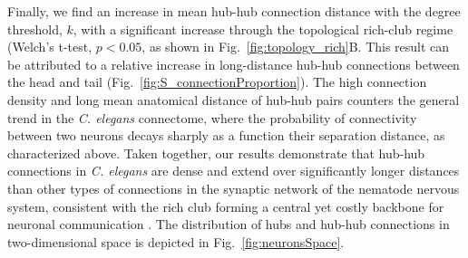 \documentclass[10pt,letterpaper]{article}
\begin{document}
Finally, we find an increase in mean hub-hub connection distance with the degree threshold, $k$, with a significant increase through the topological rich-club regime (Welch's t-test, $p < 0.05$, as shown in Fig.~\ref{fig:topology_rich}B.
This result can be attributed to a relative increase in long-distance hub-hub connections between the head and tail (Fig.~\ref{fig:S_connectionProportion}).
The high connection density and long mean anatomical distance of hub-hub pairs counters the general trend in the \emph{C. elegans} connectome, where the probability of connectivity between two neurons decays sharply as a function their separation distance, as characterized above.
Taken together, our results demonstrate that hub-hub connections in \emph{C. elegans} are dense and extend over significantly longer distances than other types of connections in the synaptic network of the nematode nervous system, consistent with the rich club forming a central yet costly backbone for neuronal communication \cite{vandenHeuvel:2012kh}.
The distribution of hubs and hub-hub connections in two-dimensional space is depicted in Fig.~\ref{fig:neuronsSpace}.




\end{document}
